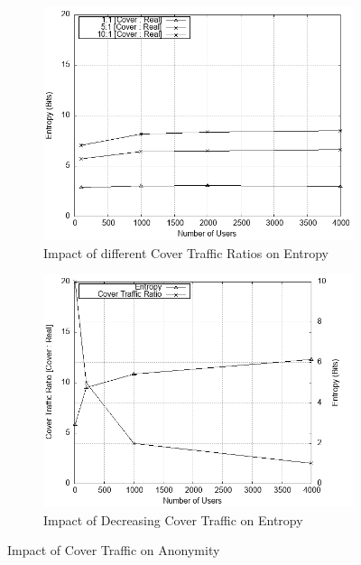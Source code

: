 \documentclass[logo,msc,cyber]{infthesis}   %
\begin{document}
\begin{figure}[h!]
    \centering
    \begin{subfigure}[b]{0.45\textwidth}
        \centering
        \includegraphics[width=\textwidth]{figures/simulator/3.png}
        \caption{Impact of different Cover Traffic Ratios on Entropy}
        \label{fig:cover-traffic-ratios}
    \end{subfigure}
    \hfill
    \begin{subfigure}[b]{0.45\textwidth}
        \centering
        \includegraphics[width=\textwidth]{figures/simulator/4.png}
        \caption{Impact of Decreasing Cover Traffic on Entropy}
        \label{fig:cover-traffic-decreasing-ratios}
    \end{subfigure}
    \caption{Impact of Cover Traffic on Anonymity}
 \end{figure}
\end{document}
